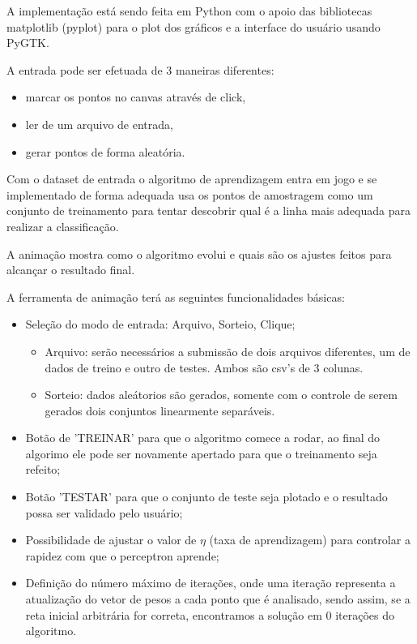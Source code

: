 \documentclass[brazil, a4paper]{article}
\begin{document}
A implementação está sendo feita em Python com o apoio das bibliotecas
matplotlib (pyplot) para o plot dos gráficos e a interface do usuário usando
PyGTK.

A entrada pode ser efetuada de 3 maneiras diferentes:
\begin{itemize}
\item marcar os pontos no canvas através de click,
\item ler de um arquivo de entrada, 
\item gerar pontos de forma aleatória.
\end{itemize}

Com o dataset de entrada o algoritmo de aprendizagem entra em jogo e se implementado de forma adequada usa os pontos de amostragem como um conjunto de treinamento para tentar descobrir qual é a linha mais adequada para realizar a classificação. 

A animação mostra como o algoritmo evolui e quais são os ajustes feitos para alcançar o resultado final.

A ferramenta de animação terá as seguintes funcionalidades básicas:
\begin{itemize} 
\item Seleção do modo de entrada: Arquivo, Sorteio, Clique;
\begin{itemize}
\item Arquivo: serão necessários a submissão de dois arquivos diferentes, um de dados de treino e outro de testes. Ambos são csv's de 3 colunas. 
\item Sorteio: dados aleátorios são gerados, somente com o controle de serem gerados dois conjuntos linearmente separáveis.

\end{itemize}
\item Botão de 'TREINAR' para que o algoritmo comece a rodar, ao final do algorimo ele pode ser novamente apertado para que o treinamento seja refeito;
\item Botão 'TESTAR' para que o conjunto de teste seja plotado e o resultado possa ser validado pelo usuário;
\item Possibilidade de  ajustar o valor de $\eta$ (taxa de aprendizagem) para controlar a rapidez com que o perceptron aprende;
\item Definição do número máximo de iterações, onde uma iteração representa a atualização do vetor de pesos a cada ponto que é analisado, sendo assim, se a reta inicial arbitrária for correta, encontramos a solução em 0 iterações do algoritmo.
\end{itemize}
\end{document}
